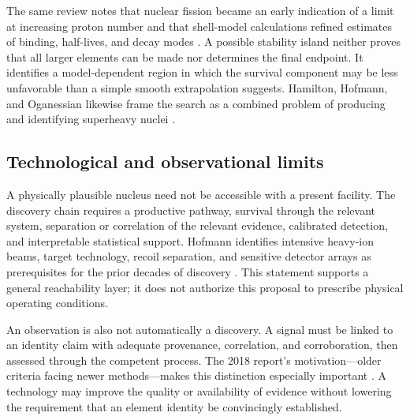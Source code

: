 \documentclass[conference]{IEEEtran}
\begin{document}
The same review notes that nuclear fission became an early indication of a limit at increasing proton number and that shell-model calculations refined estimates of binding, half-lives, and decay modes \cite{hofmann2015}. A possible stability island neither proves that all larger elements can be made nor determines the final endpoint. It identifies a model-dependent region in which the survival component may be less unfavorable than a simple smooth extrapolation suggests. Hamilton, Hofmann, and Oganessian likewise frame the search as a combined problem of producing and identifying superheavy nuclei \cite{hamilton2013}.

\subsection{Technological and observational limits}

A physically plausible nucleus need not be accessible with a present facility. The discovery chain requires a productive pathway, survival through the relevant system, separation or correlation of the relevant evidence, calibrated detection, and interpretable statistical support. Hofmann identifies intensive heavy-ion beams, target technology, recoil separation, and sensitive detector arrays as prerequisites for the prior decades of discovery \cite{hofmann2015}. This statement supports a general reachability layer; it does not authorize this proposal to prescribe physical operating conditions.

An observation is also not automatically a discovery. A signal must be linked to an identity claim with adequate provenance, correlation, and corroboration, then assessed through the competent process. The 2018 report's motivation---older criteria facing newer methods---makes this distinction especially important \cite{iupac2018}. A technology may improve the quality or availability of evidence without lowering the requirement that an element identity be convincingly established.
\end{document}
